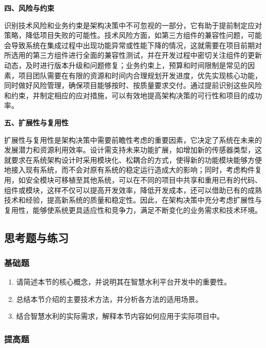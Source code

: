 \textbf{四、风险与约束}

识别技术风险和业务约束是架构决策中不可忽视的一部分，它有助于提前制定应对策略，降低项目失败的可能性。技术风险方面，如第三方组件的兼容性问题，可能会导致系统在集成过程中出现功能异常或性能下降的情况，这就需要在项目前期对所选用的第三方组件进行全面的兼容性测试，并在开发过程中密切关注组件的更新动态，及时进行版本升级和问题修复；业务约束上，预算和时间限制是常见的因素，项目团队需要在有限的资源和时间内合理规划开发进度，优先实现核心功能，同时做好风险管理，确保项目能够按时、按质量要求交付。通过提前识别这些风险和约束，并制定相应的应对措施，可以有效地提高架构决策的可行性和项目的成功率。

\textbf{五、扩展性与复用性}

扩展性与复用性是架构决策中需要前瞻性考虑的重要因素，它决定了系统在未来的发展潜力和资源利用效率。设计需支持未来功能扩展，如增加新的传感器类型，这就要求在系统架构设计时采用模块化、松耦合的方式，使得新的功能模块能够方便地接入现有系统，而不会对原有系统的稳定运行造成大的影响；同时，考虑构件复用，如安全模块可移植至其他系统，可以在不同的项目中共享和重用已有的代码、组件或模块，这样不仅可以提高开发效率，降低开发成本，还可以借助已有的成熟技术和经验，提高新系统的质量和稳定性。因此，在架构决策中充分考虑扩展性与复用性，能够使系统更具适应性和竞争力，满足不断变化的业务需求和技术环境。

\subsection{思考题与练习}\label{ux601dux8003ux9898ux4e0eux7ec3ux4e60}

\subsubsection{基础题}\label{ux57faux7840ux9898}

\begin{enumerate}
\def\labelenumi{\arabic{enumi}.}
\tightlist
\item
  请简述本节的核心概念，并说明其在智慧水利平台开发中的重要性。
\item
  总结本节介绍的主要技术方法，并分析各方法的适用场景。
\item
  结合智慧水利的实际需求，解释本节内容如何应用于实际项目中。
\end{enumerate}

\subsubsection{提高题}\label{ux63d0ux9ad8ux9898}

